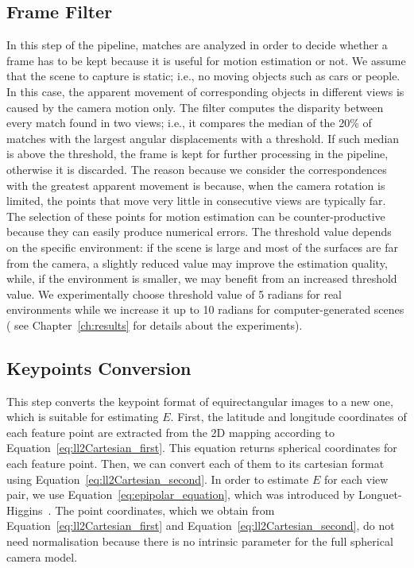 \subsection{Frame Filter}
In this step of the pipeline, matches are analyzed in order to decide 
whether a frame has to be kept because it is useful for motion estimation or
not.
%
We assume that the scene to capture is static; i.e., no moving objects such as cars or people. In this case, the apparent movement of corresponding objects in different views is caused by the camera motion only.
%
The filter computes the disparity between every match found in two views; i.e., 
it compares the median of the 20\% of matches with the largest angular 
displacements with a threshold. If such median is above 
the threshold, the frame is kept for further processing in the pipeline, 
otherwise it is discarded.
%
The reason because we consider the correspondences with the greatest
apparent movement is 
because, when the camera rotation is limited, the points that move very little 
in consecutive views are typically far. The selection of these points for motion 
estimation can be counter-productive because they can easily produce numerical 
errors.
%
The threshold value depends on the specific
environment: if the scene is large and most of the surfaces are far from the
camera, a slightly reduced value may improve the estimation quality, while,
if the environment is smaller, we may benefit from an increased threshold
value. We experimentally choose threshold value of 5 radians for real
environments while we increase it up to 10 radians for computer-generated
scenes ( see Chapter~\ref{ch:results} for details about the experiments).

\subsection{Keypoints Conversion}
\label{sec:keypoints_conversion}
%
This step converts the keypoint format of equirectangular images to a new one, which is
suitable for estimating $E$.
%
First, the latitude and longitude coordinates of each feature point are 
extracted from the 2D mapping according to Equation~\ref{eq:ll2Cartesian_first}.
This equation returns spherical coordinates for each feature point. 
Then, we can convert each of them to its cartesian format using Equation~\ref{eq:ll2Cartesian_second}. 
%
In order to estimate $E$ for each view pair, we use Equation~\ref{eq:epipolar_equation}, which was
introduced by Longuet-Higgins~\cite{longuet1981computer}.
The point coordinates, which we obtain from Equation~\ref{eq:ll2Cartesian_first} and
Equation~\ref{eq:ll2Cartesian_second}, do not need normalisation because there
is no intrinsic parameter for the full spherical camera model.


